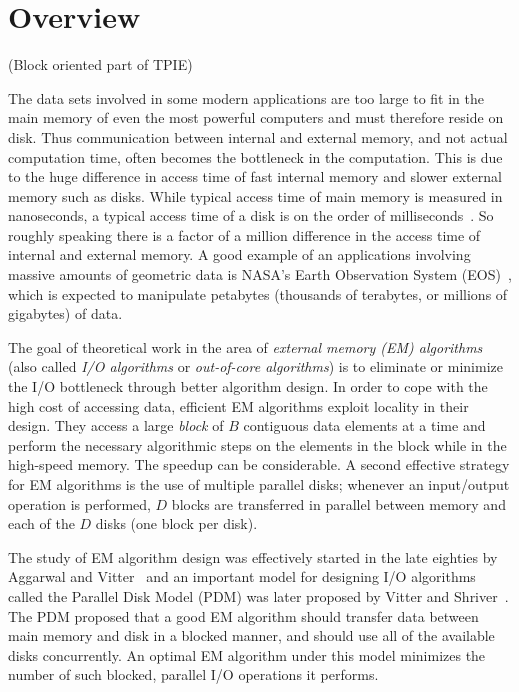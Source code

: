 \chapter{Overview}

\tobewritten (Block oriented part of TPIE)

The data sets
involved in some modern applications are too large to fit in the main
memory of even the most powerful computers and must therefore reside
on disk.  Thus communication between internal and external memory, and
not actual computation time, often becomes the bottleneck in the
computation. This is due to the huge difference in access time of fast
internal memory and slower external memory such as disks. While
typical access time of main memory is measured in nanoseconds, a
typical access time of a disk is on the order of
milliseconds~\cite{cockcroft:sun}. So roughly speaking there is a
factor of a million difference in the access time of internal and
external memory. A good example of an applications involving massive
amounts of geometric data is NASA's Earth Observation System
(EOS)~\cite{cromp,kobler:nasa}, which is expected to manipulate
petabytes (thousands of terabytes, or millions of gigabytes) of data.

The goal of theoretical work in the area of \emph{external memory (EM)
  algorithms} (also called \emph{I/O algorithms} or \emph{out-of-core
  algorithms}) is to eliminate or minimize the I/O bottleneck through
better algorithm design. In order to cope with the high cost of
accessing data, efficient EM algorithms exploit locality in their
design.  They access a large \emph{block} of $B$ contiguous data
elements at a time and perform the necessary algorithmic steps on the
elements in the block while in the high-speed memory. The speedup can
be considerable.  A second effective strategy for EM algorithms is the
use of multiple parallel disks; whenever an input/output operation is
performed, $D$ blocks are transferred in parallel between memory and
each of the $D$ disks (one block per disk).

The study of EM algorithm design was effectively started in the late
eighties by Aggarwal and Vitter~\cite{aggarwal:input} and an important
model for designing I/O algorithms called the Parallel Disk Model
(PDM) was later proposed by Vitter and Shriver~\cite{vitter:parmem1}.
The PDM proposed that a good EM algorithm should transfer data between
main memory and disk in a blocked manner, and should use all of the
available disks concurrently. An optimal EM algorithm under this model
minimizes the number of such blocked, parallel I/O operations it
performs.
 
